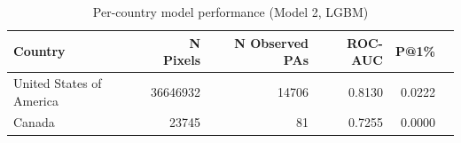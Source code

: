 \begin{table}[h]
\centering
\begin{tabular}{lrrrrr}
\toprule
Country & N Pixels & N Observed PAs & ROC-AUC & P@1\% \\
\midrule
United States of America & 36646932 & 14706 & 0.8130 & 0.0222 \\
Canada & 23745 & 81 & 0.7255 & 0.0000 \\
\bottomrule
\end{tabular}
\caption{Per-country model performance (Model 2, LGBM)}
\label{tab:country_breakdown_lgbm}
\end{table}
